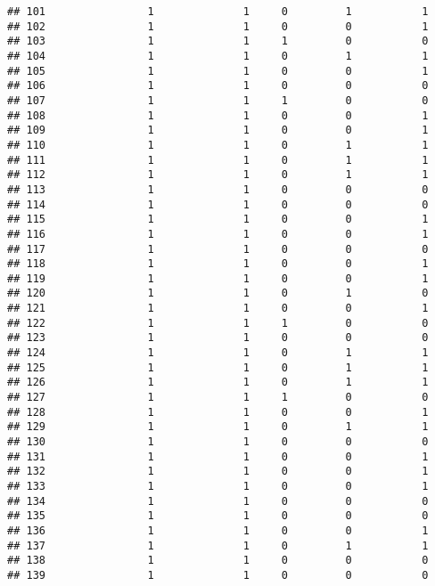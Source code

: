 \documentclass[]{article}
\begin{document}
\begin{verbatim}
## 101                1              1     0         1           1
## 102                1              1     0         0           1
## 103                1              1     1         0           0
## 104                1              1     0         1           1
## 105                1              1     0         0           1
## 106                1              1     0         0           0
## 107                1              1     1         0           0
## 108                1              1     0         0           1
## 109                1              1     0         0           1
## 110                1              1     0         1           1
## 111                1              1     0         1           1
## 112                1              1     0         1           1
## 113                1              1     0         0           0
## 114                1              1     0         0           0
## 115                1              1     0         0           1
## 116                1              1     0         0           1
## 117                1              1     0         0           0
## 118                1              1     0         0           1
## 119                1              1     0         0           1
## 120                1              1     0         1           0
## 121                1              1     0         0           1
## 122                1              1     1         0           0
## 123                1              1     0         0           0
## 124                1              1     0         1           1
## 125                1              1     0         1           1
## 126                1              1     0         1           1
## 127                1              1     1         0           0
## 128                1              1     0         0           1
## 129                1              1     0         1           1
## 130                1              1     0         0           0
## 131                1              1     0         0           1
## 132                1              1     0         0           1
## 133                1              1     0         0           1
## 134                1              1     0         0           0
## 135                1              1     0         0           0
## 136                1              1     0         0           1
## 137                1              1     0         1           1
## 138                1              1     0         0           0
## 139                1              1     0         0           0

\end{verbatim}
\end{document}
